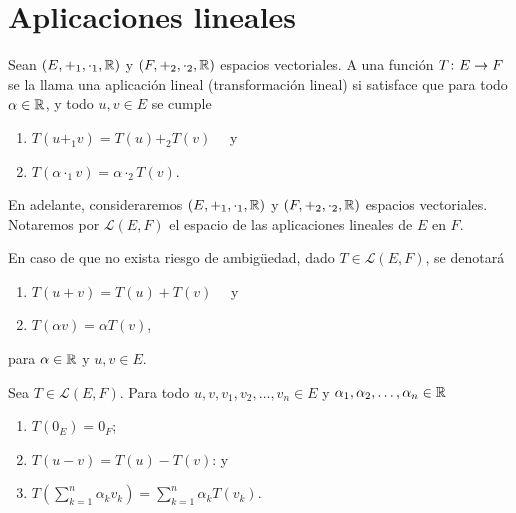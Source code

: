 \documentclass[a4,11pt]{aleph-notas}
\begin{document}
\encabezado


\section{Aplicaciones lineales}

\begin{defi}
    Sean $(E,+_1,\cdot_1,\mathbb{R})$ y $(F,+_2,\cdot_2,\mathbb{R})$ espacios vectoriales. A una función $T\colon E \rightarrow F$ se la llama una aplicación lineal (transformación lineal) si satisface que para todo $\alpha \in \mathbb{R}$, y todo $u,v \in E$ se cumple
    \begin{enumerate}
    \item 
        $T(u +_1 v) = T(u) +_2 T(v)\quad$ y
    \item 
        $T(\alpha \cdot_1 v ) = \alpha \cdot_2 T(v)$.
    \end{enumerate}
\end{defi}

En adelante, consideraremos $(E,+_1,\cdot_1,\mathbb{R})$ y $(F,+_2,\cdot_2,\mathbb{R})$ espacios vectoriales. Notaremos por $\mathcal{L}(E,F)$ el espacio de las aplicaciones lineales de $E$ en $F$.

\begin{advertencia}
    En caso de que no exista riesgo de ambigüedad, dado $T \in \mathcal{L}(E,F)$, se denotará
    \begin{enumerate}
    \item 
        $T(u + v) = T(u) + T(v)\quad$ y
    \item 
        $T(\alpha v ) = \alpha T(v)$,
    \end{enumerate}
    para $\alpha \in \mathbb{R}$ y $u,v \in E$.
\end{advertencia}
    
\begin{teo}
     Sea $T \in \mathcal{L}(E,F)$. Para todo $u,v, v_1, v_2, \ldots, v_n \in E$ y $\alpha_1, \alpha_2, \ldots, \alpha_n \in \mathbb{R}$
     \begin{enumerate}
         \item $T(0_E) = 0_F$;
         \item $T(u-v) = T(u) - T(v)$: y
         \item $T\left(\displaystyle \sum_{k=1}^n \alpha_k v_k \right)= 
         \displaystyle \sum_{k=1}^n \alpha_k T\left(v_k \right)$.
     \end{enumerate}
\end{teo}
\end{document}
